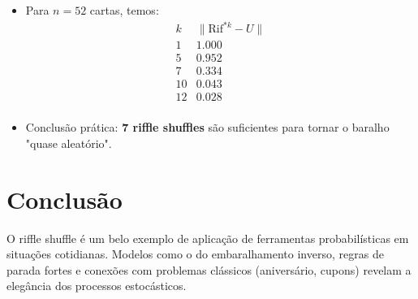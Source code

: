 \documentclass[12pt]{article}
\begin{document}
\begin{itemize}
    \item Para $n = 52$ cartas, temos:
    \[
    \begin{array}{l|l}
        k & \| \text{Rif}^{*k} - U \| \\
        \hline
        1 & 1.000 \\
        5 & 0.952 \\
        7 & 0.334 \\
        10 & 0.043 \\
        12 & 0.028 \\
    \end{array}
    \]
    \item Conclusão prática: \textbf{7 riffle shuffles} são suficientes para tornar o baralho "quase aleatório".
\end{itemize}

\section{Conclusão}

O riffle shuffle é um belo exemplo de aplicação de ferramentas probabilísticas em situações cotidianas. Modelos como o do embaralhamento inverso, regras de parada fortes e conexões com problemas clássicos (aniversário, cupons) revelam a elegância dos processos estocásticos.
\end{document}
